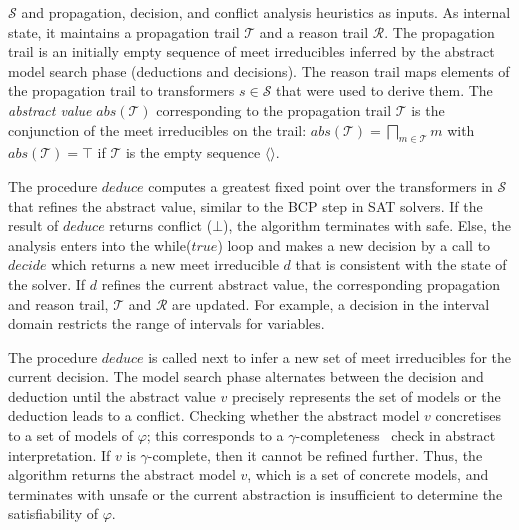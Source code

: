 $\mathcal{S}$ and propagation, decision, and conflict analysis
heuristics as inputs.  As internal state, it maintains a propagation
trail $\mathcal{T}$ and a reason trail  $\mathcal{R}$.
The propagation trail is an initially empty sequence of meet
irreducibles inferred by the abstract model search phase (deductions
and decisions). The reason trail maps  elements of the
propagation trail to transformers $s\in\mathcal{S}$ that were used to
derive them. The \emph{abstract value} $\mathit{abs}(\mathcal{T})$
corresponding to the propagation trail $\mathcal{T}$ is the
conjunction of the meet irreducibles on the trail:
$\mathit{abs}(\mathcal{T})=\bigsqcap_{m \in \mathcal{T}}m$ with
$\mathit{abs}(\mathcal{T})=\top$ if $\mathcal{T}$ is the empty
sequence $\langle\rangle$.

The procedure $deduce$ computes a greatest fixed point over the
transformers in $\mathcal{S}$ that refines the abstract value,
similar to the BCP step in SAT solvers.  If the result of $deduce$
returns \textsf{conflict} ($\bot$), the algorithm terminates with
\textsf{safe}.  Else, the analysis enters into the while($true$) loop
and makes a new decision by a call to $\mathit{decide}$ which returns
a new meet irreducible $d$ that is consistent with the state of the
solver.  If $d$
refines the current abstract value, the corresponding propagation
and reason trail, $\mathcal{T}$ and $\mathcal{R}$ are updated.
%
For example, a decision in the interval domain restricts the range of 
intervals for variables.

The procedure $deduce$ is called next to infer a new set of meet
irreducibles for the current decision.  The model search phase
alternates between the decision and deduction until the abstract value
$v$ precisely  represents the set of models or the
deduction leads to a \textsf{conflict}.  Checking whether the abstract
model $v$ concretises to a set of models of $\varphi$; this
corresponds to a $\gamma$-completeness~\cite{dhk2013-popl} check in
abstract interpretation.  If $v$ is $\gamma$-complete, then it cannot
be refined further.  Thus, the algorithm returns the abstract model
$v$, which is a set of concrete models, and terminates with
\textsf{unsafe} or the current abstraction is insufficient to
determine the satisfiability of $\varphi$.  

